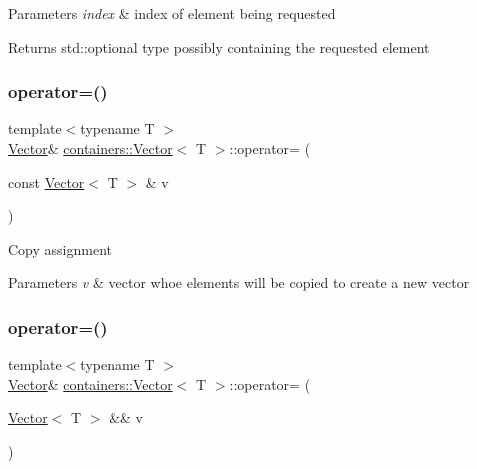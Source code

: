 \begin{DoxyParams}{Parameters}
{\em index} & index of element being requested\\
\hline
\end{DoxyParams}
\begin{DoxyReturn}{Returns}
{\ttfamily std\+::optional} type possibly containing the requested element 
\end{DoxyReturn}
\mbox{\label{classcontainers_1_1_vector_a631c15e8044b459fdf35a9f0acd0d5b0}} 
\subsubsection{\texorpdfstring{operator=()}{operator=()}\hspace{0.1cm}{\footnotesize\ttfamily [1/2]}}
{\footnotesize\ttfamily template$<$typename T $>$ \\
\hyperlink{classcontainers_1_1_vector}{Vector}\& \hyperlink{classcontainers_1_1_vector}{containers\+::\+Vector}$<$ T $>$\+::operator= (\begin{DoxyParamCaption}\item[{const \hyperlink{classcontainers_1_1_vector}{Vector}$<$ T $>$ \&}]{v }\end{DoxyParamCaption})\hspace{0.3cm}{\ttfamily [inline]}}

Copy assignment


\begin{DoxyParams}{Parameters}
{\em v} & vector whoe elements will be copied to create a new vector \\
\hline
\end{DoxyParams}
\mbox{\label{classcontainers_1_1_vector_aade29fc98f40e726bc1c624d0157e397}} 
\subsubsection{\texorpdfstring{operator=()}{operator=()}\hspace{0.1cm}{\footnotesize\ttfamily [2/2]}}
{\footnotesize\ttfamily template$<$typename T $>$ \\
\hyperlink{classcontainers_1_1_vector}{Vector}\& \hyperlink{classcontainers_1_1_vector}{containers\+::\+Vector}$<$ T $>$\+::operator= (\begin{DoxyParamCaption}\item[{\hyperlink{classcontainers_1_1_vector}{Vector}$<$ T $>$ \&\&}]{v }\end{DoxyParamCaption})\hspace{0.3cm}{\ttfamily [inline]}}

